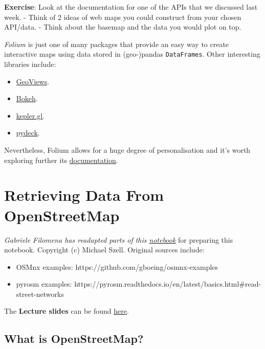 \documentclass[
  letterpaper,
  DIV=11,
  numbers=noendperiod]{scrreprt}
\providecommand{\tightlist}{%
  \setlength{\itemsep}{0pt}\setlength{\parskip}{0pt}}\usepackage{longtable,booktabs,array}
\begin{document}
\textbf{Exercise}: Look at the documentation for one of the APIs that we
discussed last week. - Think of 2 ideas of web maps you could construct
from your chosen API/data. - Think about the basemap and the data you
would plot on top.

\emph{Folium} is just one of many packages that provide an easy way to
create interactive maps using data stored in (geo-)pandas
\texttt{DataFrames}. Other interesting libraries include:

\begin{itemize}
\tightlist
\item
  \href{https://geoviews.org/}{GeoViews}.
\item
  \href{https://docs.bokeh.org/en/latest/docs/gallery.html}{Bokeh}.
\item
  \href{https://docs.kepler.gl/docs/keplergl-jupyter}{kepler.gl}.
\item
  \href{https://deckgl.readthedocs.io/en/latest/}{pydeck}.
\end{itemize}

Nevertheless, Folium allows for a huge degree of personalisation and
it's worth exploring further its
\href{https://python-visualization.github.io/folium/latest/reference.html}{documentation}.


\chapter{Retrieving Data From
OpenStreetMap}\label{retrieving-data-from-openstreetmap}

\emph{Gabriele Filomena has readapted parts of this
\href{https://github.com/mszell/geospatialdatascience/blob/main/unit08_openstreetmap/lecture08.ipynb}{notebook}}
for preparing this notebook. Copyright (c) Michael Szell. Original
sources include:

\begin{itemize}
\tightlist
\item
  OSMnx examples: https://github.com/gboeing/osmnx-examples
\item
  pyrosm examples:
  https://pyrosm.readthedocs.io/en/latest/basics.html\#read-street-networks
\end{itemize}

The \textbf{Lecture slides} can be found
\href{https://github.com/GDSL-UL/wma/raw/main/html/w07.html}{here}.

\section{What is OpenStreetMap?}\label{what-is-openstreetmap}
\end{document}

